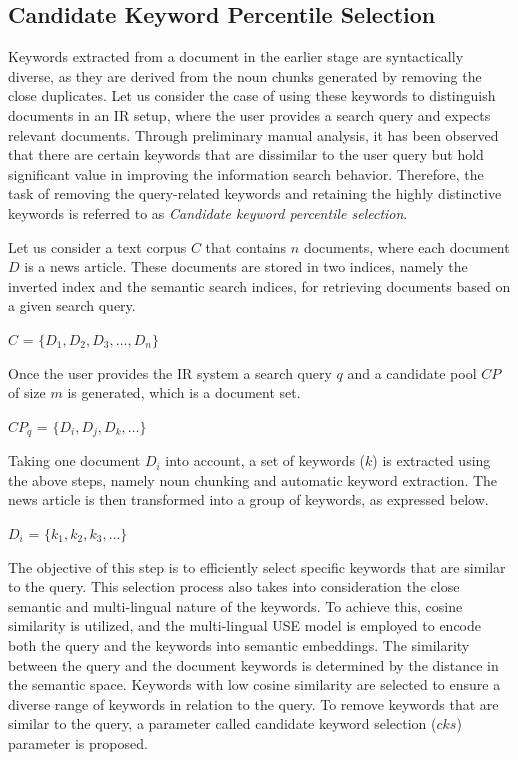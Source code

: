 \subsection{Candidate Keyword Percentile Selection}


Keywords extracted from a document in the earlier stage are syntactically diverse, as they are derived from the noun chunks generated by removing the close duplicates. Let us consider the case of using these keywords to distinguish documents in an \ac{IR} setup, where the user provides a search query and expects relevant documents. Through preliminary manual analysis, it has been observed that there are certain keywords that are dissimilar to the user query but hold significant value in improving the information search behavior. Therefore, the task of removing the query-related keywords and retaining the highly distinctive keywords is referred to as \emph{Candidate keyword percentile selection}.


Let us consider a text corpus $C$ that contains $n$ documents, where each document $D$ is a news article. These documents are stored in two indices, namely the inverted index and the semantic search indices, for retrieving documents based on a given search query.


\centerline{$C$ = $\{D_1, D_2, D_3,\dots, D_n\}$}

Once the user provides the IR system a search query $q$ and a candidate pool $CP$ of size $m$ is generated, which is a document set.

\centerline{$CP_q$ = $\{D_i, D_j, D_k,\dots\}$}


Taking one document $D_i$ into account, a set of keywords ($k$) is extracted using the above steps, namely noun chunking and automatic keyword extraction. The news article is then transformed into a group of keywords, as expressed below.


\centerline{$D_i$ = $\{k_1, k_2, k_3,\dots\}$ } 

The objective of this step is to efficiently select specific keywords that are similar to the query. This selection process also takes into consideration the close semantic and multi-lingual nature of the keywords. To achieve this, cosine similarity is utilized, and the multi-lingual \ac{USE} model is employed to encode both the query and the keywords into semantic embeddings. The similarity between the query and the document keywords is determined by the distance in the semantic space. Keywords with low cosine similarity are selected to ensure a diverse range of keywords in relation to the query. To remove keywords that are similar to the query, a parameter called candidate keyword selection ($cks$) parameter is proposed.

